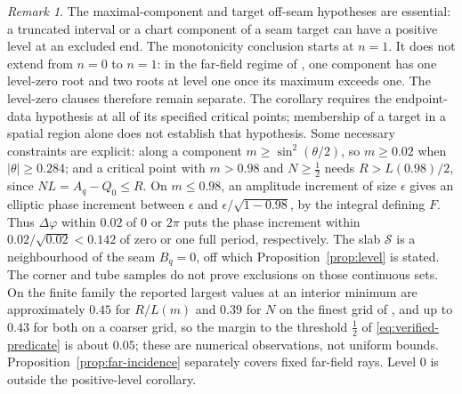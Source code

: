 \documentclass[11pt]{article}
\theoremstyle{remark}
\newtheorem{remark}[theorem]{Remark}
\begin{document}
\begin{remark}
The maximal-component and target off-seam hypotheses are essential:
a truncated interval or a chart component of a seam target can have
a positive level at an excluded end.  The monotonicity conclusion
starts at $n=1$.  It does not extend from $n=0$ to $n=1$: in the
far-field regime of \cite[Theorem 3.3]{SE2Counts}, one component
has one level-zero root and two roots at level one once its maximum
exceeds one.  The level-zero clauses therefore remain separate.
The corollary requires the endpoint-data hypothesis at all of its
specified critical points; membership of a target in a spatial region
alone does not establish that hypothesis.  Some necessary constraints are
explicit: along a component $m\ge\sin^2(\theta/2)$, so $m\ge0.02$ when
$|\theta|\ge0.284$; and a critical point with $m>0.98$ and
$N\ge\tfrac12$ needs $R>L(0.98)/2$, since
$NL=A_q-Q_0\le R$.  On $m\le0.98$, an amplitude increment of size
$\epsilon$ gives an elliptic phase increment between $\epsilon$ and
$\epsilon/\sqrt{1-0.98}$, by the integral defining $F$.  Thus
$\Delta\varphi$ within $0.02$ of $0$ or $2\pi$ puts the phase increment
within $0.02/\sqrt{0.02}<0.142$ of zero or one full period, respectively.
The slab $\mathcal S$ is a neighbourhood of the seam $B_q=0$, off which
Proposition~\ref{prop:level} is stated.  The corner and tube samples do
not prove exclusions on those continuous sets.  On the finite family the
reported largest values at an interior minimum are approximately $0.45$
for $R/L(m)$ and $0.39$ for $N$ on the finest grid of
, and up to $0.43$ for both on a
coarser grid, so the margin to the threshold $\tfrac12$ of
\eqref{eq:verified-predicate} is about
$0.05$; these are numerical observations, not uniform bounds.  Proposition~\ref{prop:far-incidence} separately
covers fixed far-field rays.  Level $0$ is outside the positive-level
corollary.
\end{remark}
\end{document}
